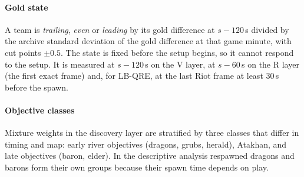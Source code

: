 \paragraph*{Gold state}
A team is \emph{trailing}, \emph{even} or \emph{leading} by its gold difference at $s{-}120$\,s divided by the archive standard deviation of the gold difference at that game minute, with cut points $\pm 0.5$.
The state is fixed before the setup begins, so it cannot respond to the setup. It is measured at $s{-}120$\,s on the V layer, at $s{-}60$\,s on the R layer (the first exact frame) and, for LB-QRE, at the last Riot frame at least 30\,s before the spawn.

\paragraph*{Objective classes}
Mixture weights in the discovery layer are stratified by three classes that differ in timing and map: early river objectives (dragons, grubs, herald), Atakhan, and late objectives (baron, elder).
In the descriptive analysis respawned dragons and barons form their own groups because their spawn time depends on play.
